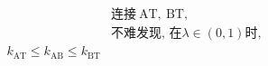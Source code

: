 \documentclass[preview]{standalone}
\begin{document}
\begin{align*}
& \text{连接}\ \mathrm{AT}, \  \mathrm{BT}, \\& \text{不难发现, 在}\lambda \in (0, 1) \text{时}, \\\ k_{\mathrm{AT}} \leq k_{\mathrm{AB}} \leq k_{\mathrm{BT}}
\end{align*}
\end{document}
